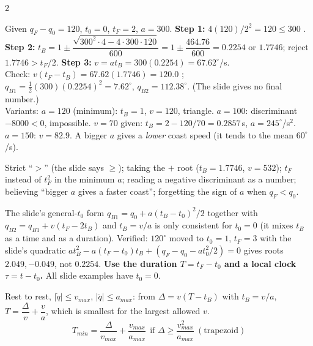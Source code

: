 \begin{multicols}{2}
\begin{recipe}
\begin{enumerate}
\end{enumerate}
\end{recipe}
\begin{worked}[slide p.\,37: $120^\circ$ in 2\,s, $a=300^\circ/$s$^2$, find the coast speed]
Given $q_F-q_0=120$, $t_0=0$, $t_F=2$, $a=300$. \textbf{Step 1:} $4(120)/2^2=120\le300$ \checkmark. \textbf{Step 2:} $t_B=1\pm\dfrac{\sqrt{300^2\cdot4-4\cdot300\cdot120}}{600}=1\pm\dfrac{464.76}{600}=0.2254$ or $1.7746$; reject $1.7746>t_F/2$. \textbf{Step 3:} $v=at_B=300(0.2254)=67.62^\circ$/s.\\
Check: $v(t_F-t_B)=67.62(1.7746)=120.0$ \checkmark; $q_{B1}=\tfrac12(300)(0.2254)^2=7.62^\circ$, $q_{B2}=112.38^\circ$. (The slide gives no final number.) \chk\\
Variants: $a=120$ (minimum): $t_B=1$, $v=120$, triangle. $a=100$: discriminant $-8000<0$, impossible. $v=70$ given: $t_B=2-120/70=0.2857$\,s, $a=245^\circ$/s$^2$. $a=150$: $v=82.9$. A bigger $a$ gives a \emph{lower} coast speed (it tends to the mean $60^\circ$/s). \chk
\end{worked}
\begin{trap}
Strict ``$>$'' (the slide says $\ge$); taking the $+$ root ($t_B=1.7746$, $v=532$); $t_F$ instead of $t_F^2$ in the minimum $a$; reading a negative discriminant as a number; believing ``bigger $a$ gives a faster coast''; forgetting the sign of $a$ when $q_F<q_0$.
\end{trap}
\begin{slideerr}[slides pp.\,33--34]
The slide's general-$t_0$ form $q_{B1}=q_0+a(t_B-t_0)^2/2$ together with $q_{B2}=q_{B1}+v(t_F-2t_B)$ and $t_B=v/a$ is only consistent for $t_0=0$ (it mixes $t_B$ as a time and as a duration). Verified: $120^\circ$ moved to $t_0=1$, $t_F=3$ with the slide's quadratic $at_B^2-a(t_F-t_0)t_B+(q_F-q_0-at_0^2/2)=0$ gives roots $2.049,-0.049$, not $0.2254$. \textbf{Use the duration $T=t_F-t_0$ and a local clock $\tau=t-t_0$.} All slide examples have $t_0=0$.
\end{slideerr}
\begin{fbx}
Rest to rest, $|\dot q|\le v_{max}$, $|\ddot q|\le a_{max}$: from $\Delta=v(T-t_B)$ with $t_B=v/a$, $T=\dfrac\Delta v+\dfrac va$, which is smallest for the largest allowed $v$.
\[T_{min}=\frac{\Delta}{v_{max}}+\frac{v_{max}}{a_{max}}\ \ \text{if }\Delta\ge\frac{v_{max}^2}{a_{max}}\ (\text{trapezoid})\]

\end{fbx}
\end{multicols}
